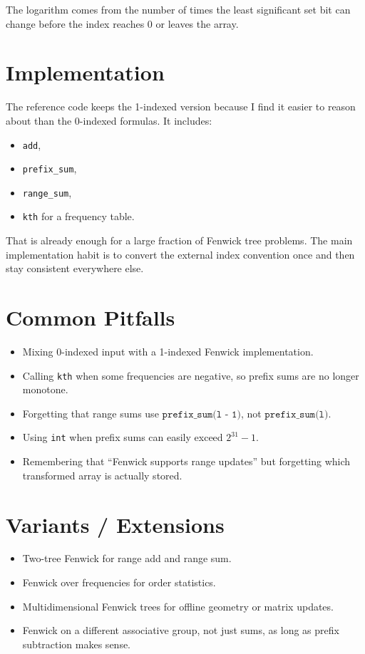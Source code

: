 The logarithm comes from the number of times the least significant set bit can change before the index reaches \(0\)
or leaves the array.

\section*{Implementation}

The reference code keeps the 1-indexed version because I find it easier to reason about than the 0-indexed formulas.
It includes:

\begin{itemize}
  \item \texttt{add},
  \item \texttt{prefix\_sum},
  \item \texttt{range\_sum},
  \item \texttt{kth} for a frequency table.
\end{itemize}

That is already enough for a large fraction of Fenwick tree problems. The main implementation habit is to convert the
external index convention once and then stay consistent everywhere else.

\section*{Common Pitfalls}

\begin{itemize}
  \item Mixing 0-indexed input with a 1-indexed Fenwick implementation.
  \item Calling \texttt{kth} when some frequencies are negative, so prefix sums are no longer monotone.
  \item Forgetting that range sums use \(\texttt{prefix\_sum(l - 1)}\), not \(\texttt{prefix\_sum(l)}\).
  \item Using \texttt{int} when prefix sums can easily exceed \(2^{31} - 1\).
  \item Remembering that ``Fenwick supports range updates'' but forgetting which transformed array is actually stored.
\end{itemize}

\section*{Variants / Extensions}

\begin{itemize}
  \item Two-tree Fenwick for range add and range sum.
  \item Fenwick over frequencies for order statistics.
  \item Multidimensional Fenwick trees for offline geometry or matrix updates.
  \item Fenwick on a different associative group, not just sums, as long as prefix subtraction makes sense.
\end{itemize}

